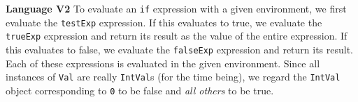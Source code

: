 \begin{minipage}[t]{\sw}
\slidenumber
\LARGE
{\bf Language V2}\exx
To evaluate an \verb'if' expression with a given environment,
we first evaluate the \verb'testExp' expression.
If this evaluates to true,
we evaluate the \verb'trueExp' expression
and return its result as the value of the entire expression.
If this evaluates to false,
we evaluate the \verb'falseExp' expression
and return its result.
Each of these expressions is evaluated
in the given environment.\exx
Since all instances of \verb'Val' are really \verb'IntVal's
(for the time being),
we regard the \verb'IntVal' object corresponding to \verb'0'
to be false and {\em all others} to be true.
\end{minipage}
\clearpage
